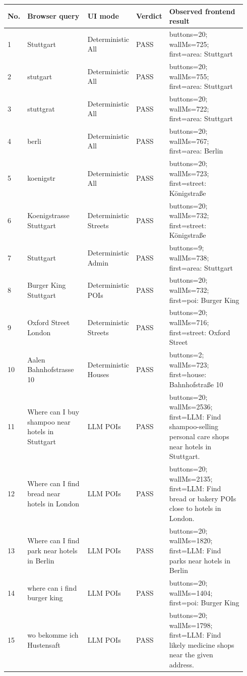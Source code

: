 \documentclass[10pt,a4paper]{article}
\begin{document}
\scriptsize
\begin{longtable}{|P{0.04\linewidth}|P{0.27\linewidth}|P{0.16\linewidth}|P{0.08\linewidth}|P{0.39\linewidth}|}
\hline
\textbf{No.} & \textbf{Browser query} & \textbf{UI mode} & \textbf{Verdict} & \textbf{Observed frontend result}\\ \hline
{} 1 & Stuttgart & Deterministic All & PASS & buttons=20; wallMs=725; first=area: Stuttgart\\ \hline
{} 2 & stutgart & Deterministic All & PASS & buttons=20; wallMs=755; first=area: Stuttgart\\ \hline
{} 3 & stuttgrat & Deterministic All & PASS & buttons=20; wallMs=722; first=area: Stuttgart\\ \hline
{} 4 & berli & Deterministic All & PASS & buttons=20; wallMs=767; first=area: Berlin\\ \hline
{} 5 & koenigstr & Deterministic All & PASS & buttons=20; wallMs=723; first=street: Königstraße\\ \hline
{} 6 & Koenigstrasse Stuttgart & Deterministic Streets & PASS & buttons=20; wallMs=732; first=street: Königstraße\\ \hline
{} 7 & Stuttgart & Deterministic Admin & PASS & buttons=9; wallMs=738; first=area: Stuttgart\\ \hline
{} 8 & Burger King Stuttgart & Deterministic POIs & PASS & buttons=20; wallMs=732; first=poi: Burger King\\ \hline
{} 9 & Oxford Street London & Deterministic Streets & PASS & buttons=20; wallMs=716; first=street: Oxford Street\\ \hline
{} 10 & Aalen Bahnhofstrasse 10 & Deterministic Houses & PASS & buttons=2; wallMs=723; first=house: Bahnhofstraße 10\\ \hline
{} 11 & Where can I buy shampoo near hotels in Stuttgart & LLM POIs & PASS & buttons=20; wallMs=2536; first=LLM: Find shampoo-selling personal care shops near hotels in Stuttgart.\\ \hline
{} 12 & Where can I find bread near hotels in London & LLM POIs & PASS & buttons=20; wallMs=2135; first=LLM: Find bread or bakery POIs close to hotels in London.\\ \hline
{} 13 & Where can I find park near hotels in Berlin & LLM POIs & PASS & buttons=20; wallMs=1820; first=LLM: Find parks near hotels in Berlin\\ \hline
{} 14 & where can i find burger king & LLM POIs & PASS & buttons=20; wallMs=1404; first=poi: Burger King\\ \hline
{} 15 & wo bekomme ich Hustensaft & LLM POIs & PASS & buttons=20; wallMs=1798; first=LLM: Find likely medicine shops near the given address.\\ \hline
\end{longtable}
\normalsize
\end{document}
